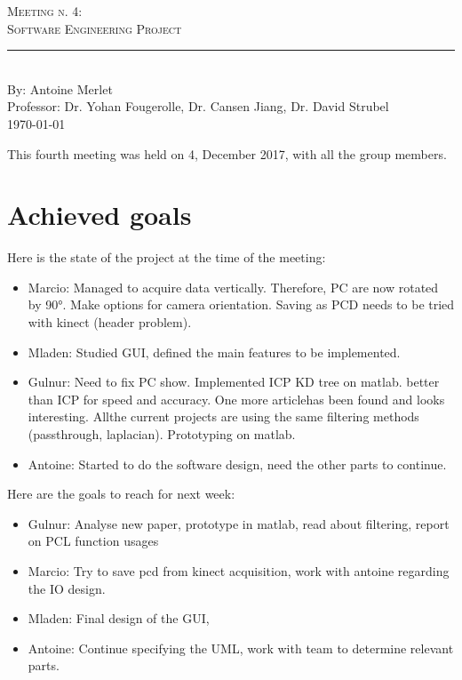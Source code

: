 \documentclass[aps,letterpaper,11pt]{revtex4}
\newcommand{\labno}{Meeting n. 4}
\newcommand{\labtitle}{Software Engineering Project}
\newcommand{\authorname}{Antoine Merlet}
\newcommand{\professor}{Dr. Yohan Fougerolle, Dr. Cansen Jiang, Dr. David Strubel}
\begin{document}
  
\begin{titlepage}
\begin{center}
{\LARGE \textsc{\labno:} \\ \vspace{4pt}}
{\Large \textsc{\labtitle} \\ \vspace{4pt}} 
\rule[13pt]{\textwidth}{1pt} \\ \vspace{150pt}
{\large By: \authorname \\ \vspace{10pt}
Professor: \professor \\ \vspace{10pt}
\today}
\end{center}




\end{titlepage}%
\newpage
\tableofcontents
\newpage

This fourth meeting was held on 4, December 2017, with all the group members.

\section{Achieved goals}

Here is the state of the project at the time of the meeting:

\begin{itemize}
\item Marcio: Managed to acquire data vertically. Therefore, PC are now rotated by 90°. Make options for camera orientation. Saving as PCD needs to be tried with kinect (header problem).
\item Mladen: Studied GUI, defined the main features to be implemented.
\item Gulnur: Need to fix PC show. Implemented ICP KD tree on matlab. better than ICP for speed and accuracy. One more articlehas been found and looks interesting. Allthe current projects are using the same filtering methods (passthrough, laplacian). Prototyping on matlab.
\item Antoine: Started to do the software design, need the other parts to continue.
\end{itemize}

Here are the goals to reach for next week:

\begin{itemize}
\item Gulnur: Analyse new paper, prototype in matlab, read about filtering, report on PCL function usages
\item Marcio: Try to save pcd from kinect acquisition, work with antoine regarding the IO design.
\item Mladen: Final design of the GUI, 
\item Antoine: Continue specifying the UML, work with team to determine relevant parts.
\end{itemize}
\end{document}

